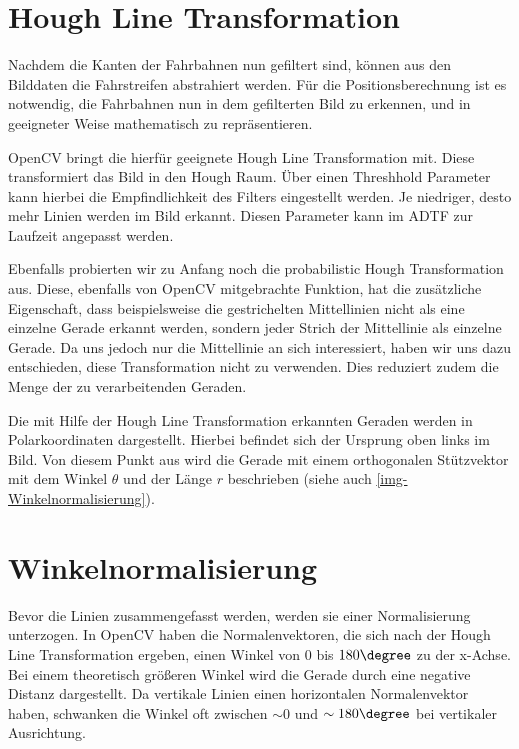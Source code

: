 \documentclass[a4paper,12pt]{report}
\begin{document}
\section{Hough Line Transformation}

	Nachdem die Kanten der Fahrbahnen nun gefiltert sind, können aus den Bilddaten die Fahrstreifen abstrahiert werden.
	Für die Positionsberechnung ist es notwendig, die Fahrbahnen nun in dem gefilterten Bild zu erkennen, und in geeigneter Weise mathematisch zu repräsentieren.

	OpenCV bringt die hierfür geeignete Hough Line Transformation mit.
	Diese transformiert das Bild in den Hough Raum.
	Über einen Threshhold Parameter kann hierbei die Empfindlichkeit des Filters eingestellt werden.
	Je niedriger, desto mehr Linien werden im Bild erkannt.
	Diesen Parameter kann im ADTF zur Laufzeit angepasst werden.

	Ebenfalls probierten wir zu Anfang noch die probabilistic Hough Transformation aus.
	Diese, ebenfalls von OpenCV mitgebrachte Funktion, hat die zusätzliche Eigenschaft, dass beispielsweise die gestrichelten Mittellinien nicht als eine einzelne Gerade erkannt werden, sondern jeder Strich der Mittellinie als einzelne Gerade.
	Da uns jedoch nur die Mittellinie an sich interessiert, haben wir uns dazu entschieden, diese Transformation nicht zu verwenden.
	Dies reduziert zudem die Menge der zu verarbeitenden Geraden.

	Die mit Hilfe der Hough Line Transformation erkannten Geraden werden in Polarkoordinaten dargestellt.
	Hierbei befindet sich der Ursprung oben links im Bild.
	Von diesem Punkt aus wird die Gerade mit einem orthogonalen Stützvektor mit dem Winkel $\theta$ und der Länge $r$ beschrieben (siehe auch \autoref{img-Winkelnormalisierung}).

\section{Winkelnormalisierung}

	Bevor die Linien zusammengefasst werden, werden sie einer Normalisierung unterzogen.
	In OpenCV haben die Normalenvektoren, die sich nach der Hough Line Transformation ergeben, einen Winkel von $0$ bis $180\degree$ zu der x-Achse.
	Bei einem theoretisch größeren Winkel wird die Gerade durch eine negative Distanz dargestellt.
	Da vertikale Linien einen horizontalen Normalenvektor haben, schwanken die Winkel oft zwischen $\sim0$ und $\sim180\degree$ bei vertikaler Ausrichtung.
	
\end{document}
